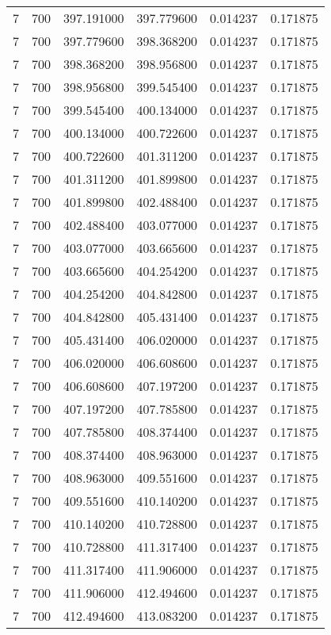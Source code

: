 \begin{longtable}{rrrrrr}
7 & 700 & 397.191000 & 397.779600 & 0.014237 & 0.171875 \\
7 & 700 & 397.779600 & 398.368200 & 0.014237 & 0.171875 \\
7 & 700 & 398.368200 & 398.956800 & 0.014237 & 0.171875 \\
7 & 700 & 398.956800 & 399.545400 & 0.014237 & 0.171875 \\
7 & 700 & 399.545400 & 400.134000 & 0.014237 & 0.171875 \\
7 & 700 & 400.134000 & 400.722600 & 0.014237 & 0.171875 \\
7 & 700 & 400.722600 & 401.311200 & 0.014237 & 0.171875 \\
7 & 700 & 401.311200 & 401.899800 & 0.014237 & 0.171875 \\
7 & 700 & 401.899800 & 402.488400 & 0.014237 & 0.171875 \\
7 & 700 & 402.488400 & 403.077000 & 0.014237 & 0.171875 \\
7 & 700 & 403.077000 & 403.665600 & 0.014237 & 0.171875 \\
7 & 700 & 403.665600 & 404.254200 & 0.014237 & 0.171875 \\
7 & 700 & 404.254200 & 404.842800 & 0.014237 & 0.171875 \\
7 & 700 & 404.842800 & 405.431400 & 0.014237 & 0.171875 \\
7 & 700 & 405.431400 & 406.020000 & 0.014237 & 0.171875 \\
7 & 700 & 406.020000 & 406.608600 & 0.014237 & 0.171875 \\
7 & 700 & 406.608600 & 407.197200 & 0.014237 & 0.171875 \\
7 & 700 & 407.197200 & 407.785800 & 0.014237 & 0.171875 \\
7 & 700 & 407.785800 & 408.374400 & 0.014237 & 0.171875 \\
7 & 700 & 408.374400 & 408.963000 & 0.014237 & 0.171875 \\
7 & 700 & 408.963000 & 409.551600 & 0.014237 & 0.171875 \\
7 & 700 & 409.551600 & 410.140200 & 0.014237 & 0.171875 \\
7 & 700 & 410.140200 & 410.728800 & 0.014237 & 0.171875 \\
7 & 700 & 410.728800 & 411.317400 & 0.014237 & 0.171875 \\
7 & 700 & 411.317400 & 411.906000 & 0.014237 & 0.171875 \\
7 & 700 & 411.906000 & 412.494600 & 0.014237 & 0.171875 \\
7 & 700 & 412.494600 & 413.083200 & 0.014237 & 0.171875 \\

\end{longtable}
